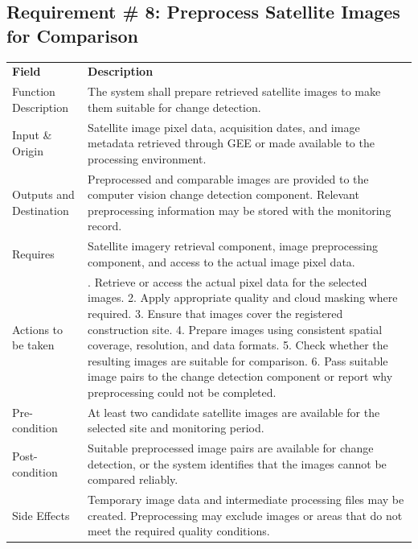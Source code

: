 \documentclass[12pt,a4paper]{report}
\begin{document}
\subsection{Requirement \# 8: Preprocess Satellite Images for
Comparison}\label{requirement-8-preprocess-satellite-images-for-comparison}

\begin{longtable}[]{@{}
  >{\raggedright\arraybackslash}p{}
  >{\raggedright\arraybackslash}p{}@{}}
\toprule\noalign{}
\endhead
\bottomrule\noalign{}
\endlastfoot
\textbf{Field} & \textbf{Description} \\
Function Description & The system shall prepare retrieved satellite
images to make them suitable for change detection. \\
Input \& Origin & Satellite image pixel data, acquisition dates, and
image metadata retrieved through GEE or made available to the processing
environment. \\
Outputs and Destination & Preprocessed and comparable images are
provided to the computer vision change detection component. Relevant
preprocessing information may be stored with the monitoring record. \\
Requires & Satellite imagery retrieval component, image preprocessing
component, and access to the actual image pixel data. \\
Actions to be taken & 1. Retrieve or access the actual pixel data for
the selected images. 2. Apply appropriate quality and cloud masking
where required. 3. Ensure that images cover the registered construction
site. 4. Prepare images using consistent spatial coverage, resolution,
and data formats. 5. Check whether the resulting images are suitable for
comparison. 6. Pass suitable image pairs to the change detection
component or report why preprocessing could not be completed. \\
Pre-condition & At least two candidate satellite images are available
for the selected site and monitoring period. \\
Post-condition & Suitable preprocessed image pairs are available for
change detection, or the system identifies that the images cannot be
compared reliably. \\
Side Effects & Temporary image data and intermediate processing files
may be created. Preprocessing may exclude images or areas that do not
meet the required quality conditions. \\
\end{longtable}
\end{document}
